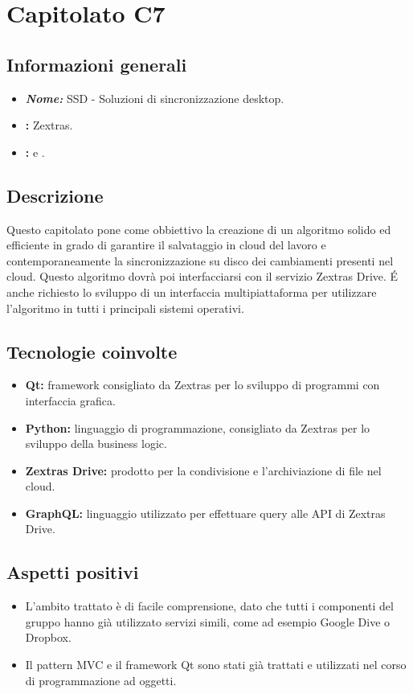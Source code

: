 \section{Capitolato C7}

\subsection{Informazioni generali}
\begin{itemize}
\item \textbf{\emph{Nome:}} SSD - Soluzioni di sincronizzazione desktop.
\item \textbf{\commitProg:} Zextras.
\item \textbf{\proponProg:} \VT{} e \CR.
\end{itemize}

\subsection{Descrizione}
Questo capitolato pone come obbiettivo la creazione di un algoritmo solido ed efficiente in grado di garantire il salvataggio in cloud del lavoro e contemporaneamente la sincronizzazione su disco dei cambiamenti presenti nel cloud. Questo algoritmo dovrà poi interfacciarsi con il servizio Zextras Drive. É anche richiesto lo sviluppo di un interfaccia multipiattaforma per utilizzare l'algoritmo in tutti i principali sistemi operativi.

\subsection{Tecnologie coinvolte}
\begin{itemize}
\item \textbf{Qt:} framework consigliato da Zextras per lo sviluppo di programmi con interfaccia grafica.
\item \textbf{Python:} linguaggio di programmazione, consigliato da Zextras per lo sviluppo della business logic.
\item \textbf{Zextras Drive:} prodotto per la condivisione e l'archiviazione di file nel cloud.
\item \textbf{GraphQL:} linguaggio utilizzato per effettuare query alle API di Zextras Drive.
\end{itemize}

\subsection{Aspetti positivi}
\begin{itemize}
\item L'ambito trattato è di facile comprensione, dato che tutti i componenti del gruppo hanno già utilizzato servizi simili, come ad esempio Google Dive o Dropbox.
\item Il pattern MVC e il framework Qt sono stati già trattati e utilizzati nel corso di programmazione ad oggetti.
\end{itemize}

